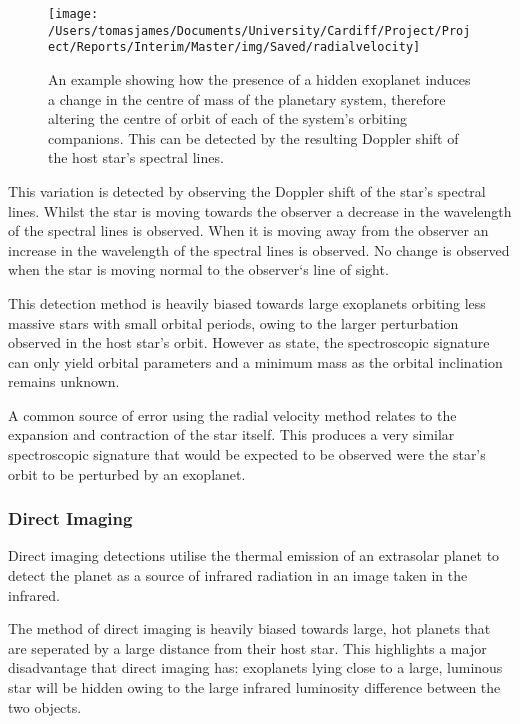 \documentclass{report}
\begin{document}
\begin{figure}[H]
\centering
    \texttt{[image: /Users/tomasjames/Documents/University/Cardiff/Project/Project/Reports/Interim/Master/img/Saved/radialvelocity]}
\caption[An example showing how the presence of a hidden exoplanet induces a change in the centre of mass of the planetary system, therefore altering the centre of orbit of each of the system's orbiting companions. This can be detected by the resulting Doppler shift of the host star's spectral lines.] {An example showing how the presence of a hidden exoplanet induces a change in the centre of mass of the planetary system, therefore altering the centre of orbit of each of the system's orbiting companions. This can be detected by the resulting Doppler shift of the host star's spectral lines. \parencite{rvdetect}}\label{rvdetect}
\end{figure}

This variation is detected by observing the Doppler shift of the star’s spectral lines. Whilst the star is moving towards the observer a decrease in the wavelength of the spectral lines is observed. When it is moving away from the observer an increase in the wavelength of the spectral lines is observed. No change is observed when the star is moving normal to the observer`s line of sight. 

This detection method is heavily biased towards large exoplanets orbiting less massive stars with small orbital periods, owing to the larger perturbation observed in the host star’s orbit. However as \textcite{stats} state, the spectroscopic signature can only yield orbital parameters and a minimum mass as the orbital inclination remains unknown. 

A common source of error using the radial velocity method relates to the expansion and contraction of the star itself. This produces a very similar spectroscopic signature that would be expected to be observed were the star's orbit to be perturbed by an exoplanet.

\subsubsection{Direct Imaging }
Direct imaging detections utilise the thermal emission of an extrasolar planet to detect the planet as a source of infrared radiation in an image taken in the infrared. 

The method of direct imaging is heavily biased towards large, hot planets that are seperated by a large distance from their host star. This highlights a major disadvantage that direct imaging has: exoplanets lying close to a large, luminous star will be hidden owing to the large infrared luminosity difference between the two objects.   
\end{document}
